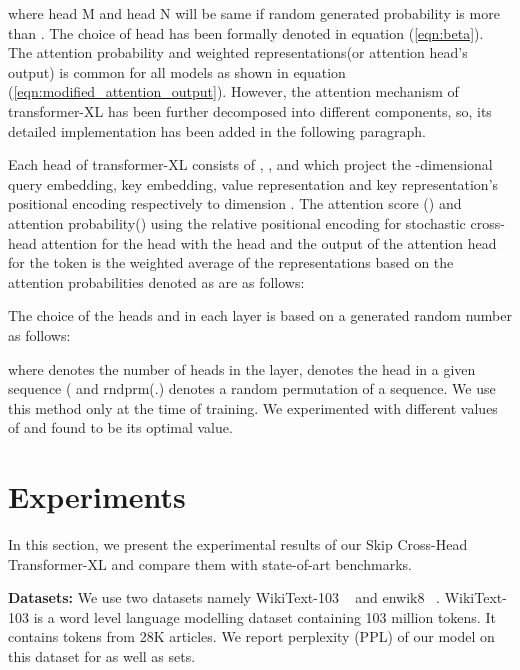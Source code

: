 \documentclass[11pt]{article}
\begin{document}
where head M and head N will be same if random generated probability  is more than . The choice of head has been formally denoted in equation (\ref{eqn:beta}). The attention probability and weighted representations(or attention head's output) is common for all models as shown in equation (\ref{eqn:modified_attention_output}). However, the attention mechanism of transformer-XL has been further decomposed into different components, so, its detailed implementation has been added in the following paragraph.


Each head of transformer-XL consists of , ,  and  which project the -dimensional query embedding, key embedding, value representation and key representation's positional encoding respectively to dimension . The attention score () and attention probability() using the relative positional encoding for stochastic cross-head attention for the  head with the  head and the output of the  attention head for the  token is the weighted average of the representations based on the attention probabilities denoted as are as follows:














The choice of the heads  and  in each layer is based on a generated random number  as follows:








 



where  denotes the number of heads in the layer,  denotes the  head in a given sequence ( and rndprm(.) denotes a random permutation of a sequence. We use this method only at the time of training. We experimented with different values of  and found  to be its optimal value.





\section{Experiments}
\label{Experiments}




In this section, we present the experimental results of our Skip Cross-Head Transformer-XL and compare them with state-of-art benchmarks.


\textbf{Datasets:} We use two datasets namely WikiText-103 ~\citep{DBLP:conf/iclr/MerityX0S17} and enwik8 ~\citep{mahoney2011large}. WikiText-103 is a word level language modelling dataset containing 103 million tokens. It contains tokens from 28K articles. We report perplexity (PPL) of our model on this dataset for  as well as  sets. 
\end{document}

